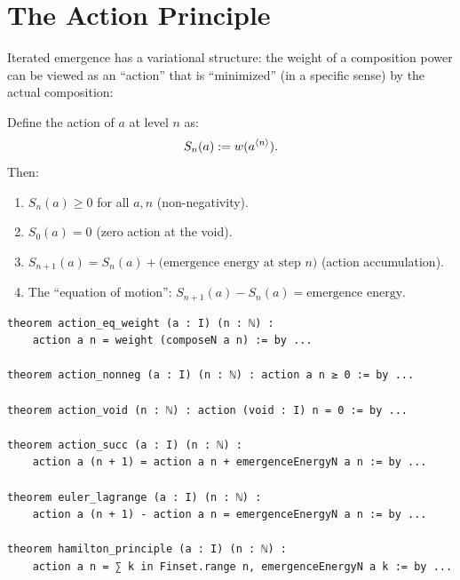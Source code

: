 \section{The Action Principle}

Iterated emergence has a variational structure: the weight of a composition power
can be viewed as an ``action'' that is ``minimized'' (in a specific sense) by the
actual composition:

\begin{theorem}
\label{thm:action}
Define the action of $a$ at level $n$ as:
\[
  S_n(a) := w(a^{\langle n \rangle}).
\]
Then:
\begin{enumerate}
  \item $S_n(a) \geq 0$ for all $a, n$ (non-negativity).
  \item $S_0(a) = 0$ (zero action at the void).
  \item $S_{n+1}(a) = S_n(a) + \text{(emergence energy at step } n\text{)}$
    (action accumulation).
  \item The ``equation of motion'': $S_{n+1}(a) - S_n(a) = \text{emergence energy}$.
\end{enumerate}
\end{theorem}

\begin{lstlisting}[caption={Action principle (IDT\_v3\_Emergence.lean)}]
theorem action_eq_weight (a : I) (n : ℕ) :
    action a n = weight (composeN a n) := by ...

theorem action_nonneg (a : I) (n : ℕ) : action a n ≥ 0 := by ...

theorem action_void (n : ℕ) : action (void : I) n = 0 := by ...

theorem action_succ (a : I) (n : ℕ) :
    action a (n + 1) = action a n + emergenceEnergyN a n := by ...

theorem euler_lagrange (a : I) (n : ℕ) :
    action a (n + 1) - action a n = emergenceEnergyN a n := by ...

theorem hamilton_principle (a : I) (n : ℕ) :
    action a n = ∑ k in Finset.range n, emergenceEnergyN a k := by ...
\end{lstlisting}

